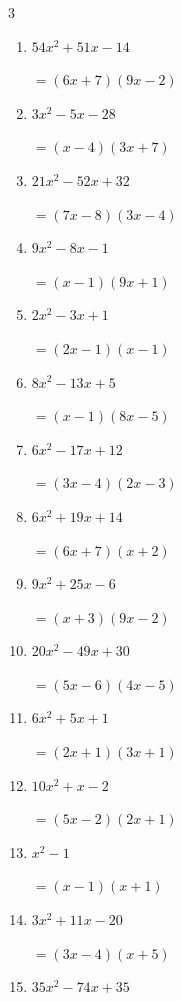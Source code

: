 \begin{multicols}{3}
\begin{enumerate}
\columnbreak %

\resetques

  \item $54x^{2}+51x-14$

        $=(6x+7)(9x-2)$

  \item $3x^{2}-5x-28$

        $=(x-4)(3x+7)$

  \item $21x^{2}-52x+32$

        $=(7x-8)(3x-4)$

  \item $9x^{2}-8x-1$

        $=(x-1)(9x+1)$

  \item $2x^{2}-3x+1$

        $=(2x-1)(x-1)$

  \item $8x^{2}-13x+5$

        $=(x-1)(8x-5)$

  \item $6x^{2}-17x+12$

        $=(3x-4)(2x-3)$

  \item $6x^{2}+19x+14$

        $=(6x+7)(x+2)$

  \item $9x^{2}+25x-6$

        $=(x+3)(9x-2)$

  \item $20x^{2}-49x+30$

        $=(5x-6)(4x-5)$

\columnbreak %

  \item $6x^{2}+5x+1$

        $=(2x+1)(3x+1)$

  \item $10x^{2}+x-2$

        $=(5x-2)(2x+1)$

  \item $x^{2}-1$

        $=(x-1)(x+1)$

  \item $3x^{2}+11x-20$

        $=(3x-4)(x+5)$

  \item $35x^{2}-74x+35$


\end{enumerate}
\end{multicols}
